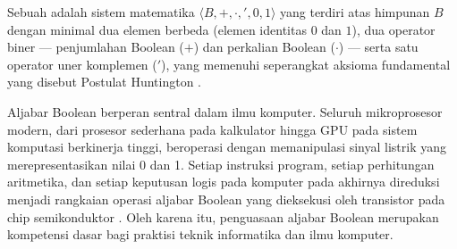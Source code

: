 \begin{definisi}
Sebuah  adalah sistem matematika $\langle B, +, \cdot, ', 0, 1 \rangle$ yang terdiri atas himpunan $B$ dengan minimal dua elemen berbeda (elemen identitas $0$ dan $1$), dua operator biner --- penjumlahan Boolean ($+$) dan perkalian Boolean ($\cdot$) --- serta satu operator uner komplemen ($'$), yang memenuhi seperangkat aksioma fundamental yang disebut Postulat Huntington \cite{rosen2019}.
\end{definisi}

Aljabar Boolean berperan sentral dalam ilmu komputer. Seluruh mikroprosesor modern, dari prosesor sederhana pada kalkulator hingga GPU pada sistem komputasi berkinerja tinggi, beroperasi dengan memanipulasi sinyal listrik yang merepresentasikan nilai 0 dan 1. Setiap instruksi program, setiap perhitungan aritmetika, dan setiap keputusan logis pada komputer pada akhirnya direduksi menjadi rangkaian operasi aljabar Boolean yang dieksekusi oleh transistor pada chip semikonduktor \cite{allaboutcircuits_boolean}. Oleh karena itu, penguasaan aljabar Boolean merupakan kompetensi dasar bagi praktisi teknik informatika dan ilmu komputer.
